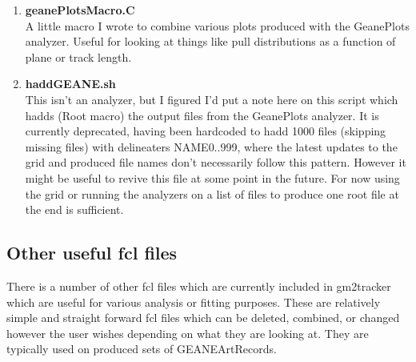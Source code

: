 \begin{enumerate}
      \item{\bf{geanePlotsMacro.C}} \\
      A little macro I wrote to combine various plots produced with the GeanePlots analyzer. Useful for looking at things like pull distributions as a function of plane or track length.

      \item{\bf{haddGEANE.sh}} \\
      This isn't an analyzer, but I figured I'd put a note here on this script which hadds (Root macro) the output files from the GeanePlots analyzer. It is currently deprecated, having been hardcoded to hadd 1000 files (skipping missing files) with delineaters {NAME}{0..999}, where the latest updates to the grid and produced file names don't necessarily follow this pattern. However it might be useful to revive this file at some point in the future. For now using the grid or running the analyzers on a list of files to produce one root file at the end is sufficient.

    \end{enumerate}


  \subsection{Other useful fcl files}

    There is a number of other fcl files which are currently included in gm2tracker which are useful for various analysis or fitting purposes. These are relatively simple and straight forward fcl files which can be deleted, combined, or changed however the user wishes depending on what they are looking at. They are typically used on produced sets of GEANEArtRecords.

